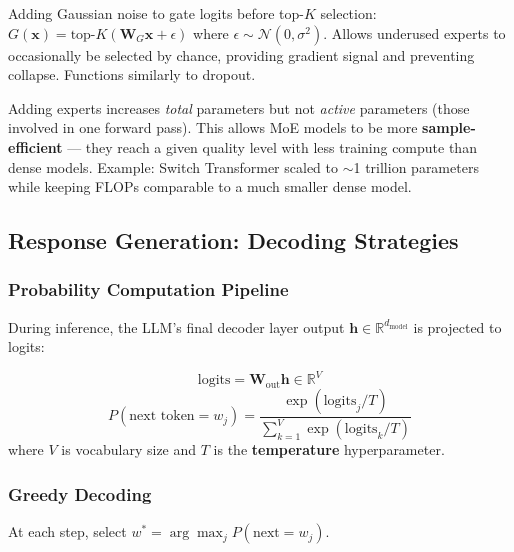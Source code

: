 \documentclass[11pt, a4paper]{article}
\begin{document}
\begin{notebox}
Adding Gaussian noise to gate logits before top-$K$ selection: $G(\mathbf{x}) = \text{top-}K(\mathbf{W}_G \mathbf{x} + \epsilon)$ where $\epsilon \sim \mathcal{N}(0, \sigma^2)$. Allows underused experts to occasionally be selected by chance, providing gradient signal and preventing collapse. Functions similarly to dropout.
\end{notebox}

\begin{notebox}
Adding experts increases \emph{total} parameters but not \emph{active} parameters (those involved in one forward pass). This allows MoE models to be more \textbf{sample-efficient} --- they reach a given quality level with less training compute than dense models. Example: Switch Transformer scaled to $\sim$1 trillion parameters while keeping FLOPs comparable to a much smaller dense model.
\end{notebox}

\subsection{Response Generation: Decoding Strategies}

\subsubsection{Probability Computation Pipeline}

During inference, the LLM's final decoder layer output $\mathbf{h} \in \mathbb{R}^{d_{\text{model}}}$ is projected to logits:

\begin{mathbox}
\[
\text{logits} = \mathbf{W}_{\text{out}} \mathbf{h} \in \mathbb{R}^V
\]
\[
P(\text{next token} = w_j) = \frac{\exp(\text{logits}_j / T)}{\sum_{k=1}^{V} \exp(\text{logits}_k / T)}
\]
where $V$ is vocabulary size and $T$ is the \textbf{temperature} hyperparameter.
\end{mathbox}

\subsubsection{Greedy Decoding}

At each step, select $w^* = \arg\max_j P(\text{next} = w_j)$.
\end{document}
